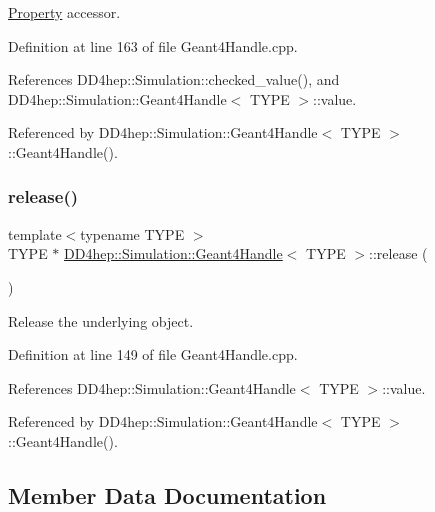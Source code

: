 \hyperlink{class_d_d4hep_1_1_property}{Property} accessor. 



Definition at line 163 of file Geant4\+Handle.\+cpp.



References D\+D4hep\+::\+Simulation\+::checked\+\_\+value(), and D\+D4hep\+::\+Simulation\+::\+Geant4\+Handle$<$ T\+Y\+P\+E $>$\+::value.



Referenced by D\+D4hep\+::\+Simulation\+::\+Geant4\+Handle$<$ T\+Y\+P\+E $>$\+::\+Geant4\+Handle().

\hypertarget{class_d_d4hep_1_1_simulation_1_1_geant4_handle_a09da8eea7f4d324e8f5dcdc6b53bb861}{}\label{class_d_d4hep_1_1_simulation_1_1_geant4_handle_a09da8eea7f4d324e8f5dcdc6b53bb861} 
\subsubsection{\texorpdfstring{release()}{release()}}
{\footnotesize\ttfamily template$<$typename T\+Y\+PE $>$ \\
T\+Y\+PE $\ast$ \hyperlink{class_d_d4hep_1_1_simulation_1_1_geant4_handle}{D\+D4hep\+::\+Simulation\+::\+Geant4\+Handle}$<$ T\+Y\+PE $>$\+::release (\begin{DoxyParamCaption}{ }\end{DoxyParamCaption})}



Release the underlying object. 



Definition at line 149 of file Geant4\+Handle.\+cpp.



References D\+D4hep\+::\+Simulation\+::\+Geant4\+Handle$<$ T\+Y\+P\+E $>$\+::value.



Referenced by D\+D4hep\+::\+Simulation\+::\+Geant4\+Handle$<$ T\+Y\+P\+E $>$\+::\+Geant4\+Handle().



\subsection{Member Data Documentation}
\hypertarget{class_d_d4hep_1_1_simulation_1_1_geant4_handle_a5bd7f10667956413e9aa66cad5ad9d7d}{}\label{class_d_d4hep_1_1_simulation_1_1_geant4_handle_a5bd7f10667956413e9aa66cad5ad9d7d} 
